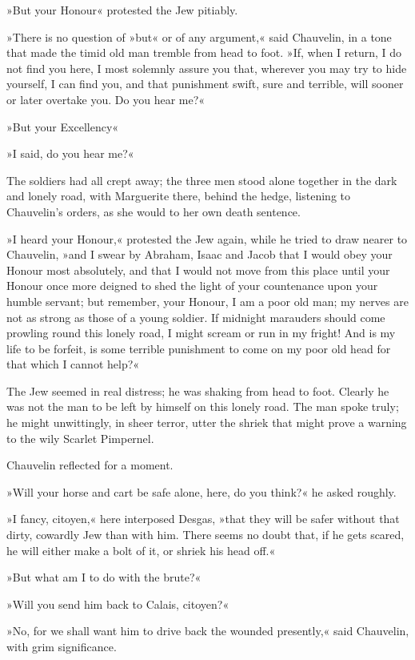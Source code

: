 »But your Honour\longdash« protested the Jew pitiably.

»There is no question of »but« or of any argument,« said Chauvelin, in a tone that made the timid old man tremble from head to foot. »If, when I return, I do not find you here, I most solemnly assure you that, wherever you may try to hide yourself, I can find you, and that punishment swift, sure and terrible, will sooner or later overtake you. Do you hear me?«

»But your Excellency\textellipsis«

»I said, do you hear me?«

The soldiers had all crept away; the three men stood alone together in the dark and lonely road, with Marguerite there, behind the hedge, listening to Chauvelin's orders, as she would to her own death sentence.

»I heard your Honour,« protested the Jew again, while he tried to draw nearer to Chauvelin, »and I swear by Abraham, Isaac and Jacob that I would obey your Honour most absolutely, and that I would not move from this place until your Honour once more deigned to shed the light of your countenance upon your humble servant; but remember, your Honour, I am a poor old man; my nerves are not as strong as those of a young soldier. If midnight marauders should come prowling round this lonely road, I might scream or run in my fright! And is my life to be forfeit, is some terrible punishment to come on my poor old head for that which I cannot help?«

The Jew seemed in real distress; he was shaking from head to foot. Clearly he was not the man to be left by himself on this lonely road. The man spoke truly; he might unwittingly, in sheer terror, utter the shriek that might prove a warning to the wily Scarlet Pimpernel.

Chauvelin reflected for a moment.

»Will your horse and cart be safe alone, here, do you think?« he asked roughly.

»I fancy, citoyen,« here interposed Desgas, »that they will be safer without that dirty, cowardly Jew than with him. There seems no doubt that, if he gets scared, he will either make a bolt of it, or shriek his head off.«

»But what am I to do with the brute?«

»Will you send him back to Calais, citoyen?«

»No, for we shall want him to drive back the wounded presently,« said Chauvelin, with grim significance.

